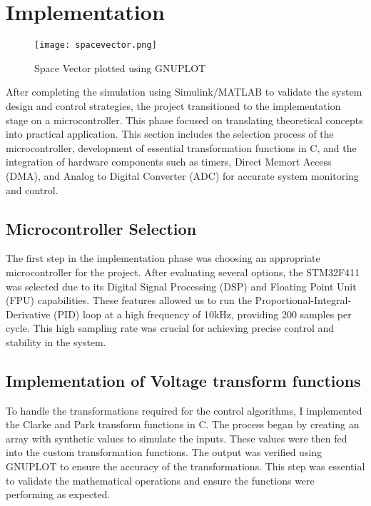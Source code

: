 \section{Implementation}
\begin{figure}[h]
    \centering
    \texttt{[image: spacevector.png]}
    \caption{Space Vector plotted using GNUPLOT}
    \label{fig:Space Vector Generated using C code}
\end{figure}
After completing the simulation using Simulink/MATLAB to validate
the system design and control strategies, the project transitioned to the
implementation stage on a microcontroller. This phase focused on translating
theoretical concepts into practical application. This section includes the
selection process of the microcontroller, development of essential
transformation functions in C, and the integration of hardware components such
as timers, Direct Memort Access (DMA), and Analog to Digital Converter (ADC)
for accurate system monitoring and control.

\subsection{Microcontroller Selection}
The first step in the implementation phase was choosing an appropriate
microcontroller for the project. After evaluating several options, the
STM32F411 was selected due to its Digital Signal Processing (DSP) and Floating
Point Unit (FPU) capabilities. These features allowed us to run the
Proportional-Integral-Derivative (PID) loop at a high frequency of 10kHz,
providing 200 samples per cycle. This high sampling rate was crucial for
achieving precise control and stability in the system.

\subsection{Implementation of Voltage transform functions}
To handle the transformations required for the control algorithms, I
implemented the Clarke and Park transform functions in C. The process began by
creating an array with synthetic values to simulate the inputs. These values
were then fed into the custom transformation functions. The output was verified
using GNUPLOT to ensure the accuracy of the transformations. This step was
essential to validate the mathematical operations and ensure the functions were
performing as expected.


